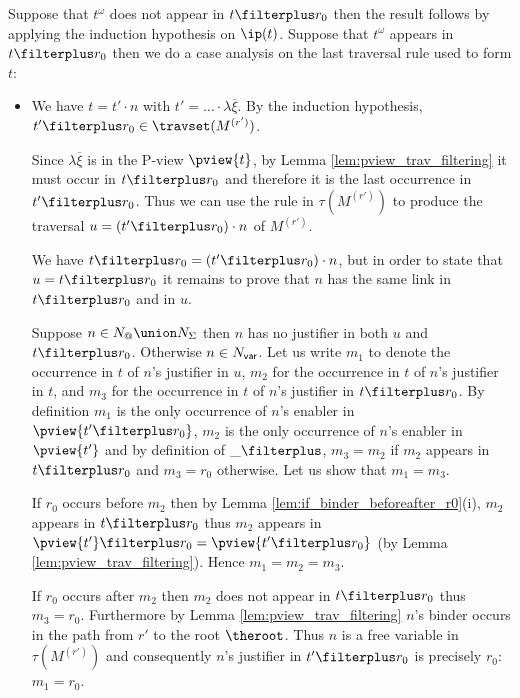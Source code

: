     Suppose that $t^\omega$ does not appear in $t \filterplus r_0$ then
    the result follows by applying the induction hypothesis on $\ip(t)$.
    Suppose that $t^\omega$ appears in $t \filterplus r_0$ then we do a case analysis on the last traversal rule used to form $t$:
      \begin{itemize}
    \item {}
        We have  $t = t' \cdot n$ with $t' = \ldots \cdot \lambda \overline{\xi}$. By the
        induction hypothesis, $t' \filterplus r_0 \in
        \travset(M^{(r')})$.

        Since $\lambda \overline{\xi}$ is in the P-view $\pview{t}$,
        by Lemma \ref{lem:pview_trav_filtering} it must occur in
        $t\filterplus r_0$ and therefore it is the last occurrence
        in $t'\filterplus r_0$. Thus we can use the rule
         in $\tau(M^{(r')})$ to produce the traversal
        $u = (t'\filterplus r_0) \cdot n$ of $M^{(r')}$.

        We have $t \filterplus r_0 = (t'\filterplus r_0) \cdot n$,
         but in order to state that $u = t \filterplus r_0$
         it remains to prove that $n$ has the same link in $t \filterplus r_0$ and in $u$.

        Suppose $n \in N_@ \union N_\Sigma$ then $n$ has no justifier in both $u$ and $t\filterplus r_0$.
        Otherwise $n \in N_{\sf var}$.
        Let us write $m_1$ to denote the occurrence in $t$ of $n$'s justifier in $u$,
        $m_2$ for the occurrence in $t$ of $n$'s justifier in $t$,
        and $m_3$ for the occurrence in $t$ of $n$'s justifier in $t \filterplus r_0$.
        By definition $m_1$ is the only occurrence of $n$'s enabler in $\pview{t'\filterplus r_0}$,
        $m_2$ is the only occurrence of $n$'s enabler in $\pview{t'}$
        and by definition of $\_ \filterplus$, $m_3 = m_2$ if $m_2$ appears in
        $t \filterplus r_0$ and $m_3 = r_0$ otherwise.
        Let us show that $m_1 = m_3$.

        If $r_0$ occurs before $m_2$ then by Lemma \ref{lem:if_binder_beforeafter_r0}(i), $m_2$ appears in $t \filterplus r_0$ thus
        $m_2$ appears in $\pview{t'} \filterplus r_0 = \pview{t'\filterplus r_0}$ (by Lemma \ref{lem:pview_trav_filtering}). Hence $m_1 = m_2 = m_3$.

        If $r_0$ occurs after $m_2$ then $m_2$ does not appear in $t\filterplus r_0$ thus $m_3 = r_0$.
        Furthermore by Lemma \ref{lem:pview_trav_filtering}
    $n$'s binder occurs in the path from $r'$ to the root $\theroot$. Thus
    $n$ is a free variable in $\tau(M^{(r')})$ and consequently
    $n$'s justifier in $t'\filterplus r_0$ is precisely $r_0$: $m_1 = r_0$.


\end{itemize}
